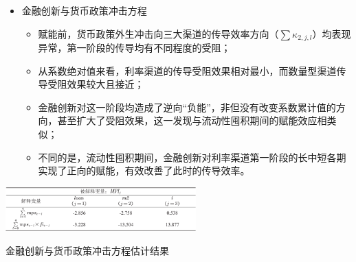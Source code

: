 \documentclass[12pt,aspectratio=169]{ctexbeamer}
\begin{document}
			\begin{frame}
				\frametitle{}
				\vspace{5mm}
				\begin{itemize}
					\item 金融创新与货币政策冲击方程
					\begin{itemize}
						\justifying
						\footnotesize
						\item 赋能前，货币政策外生冲击向三大渠道的传导效率方向（$\sum{\kappa _{2,j,l}}$）均表现异常，第一阶段的传导均有不同程度的受阻；
						\item 从系数绝对值来看，利率渠道的传导受阻效果相对最小，而数量型渠道传导受阻效果较大且接近；
						\item 金融创新对这一阶段均造成了逆向“负能”，非但没有改变系数累计值的方向，甚至扩大了受阻效果，这一发现与流动性囤积期间的赋能效应相类似；
						\item 不同的是，流动性囤积期间，金融创新对利率渠道第一阶段的长中短各期实现了正向的赋能，有效改善了此时的传导效率。
					\end{itemize}
				\end{itemize}
				\begin{table}
					\centering
					\includegraphics[width=0.55\textwidth]{figures/tab.6-1}
					\caption{金融创新与货币政策冲击方程估计结果}
					\label{tab.6-1}
				\end{table}
			\end{frame}
\end{document}

